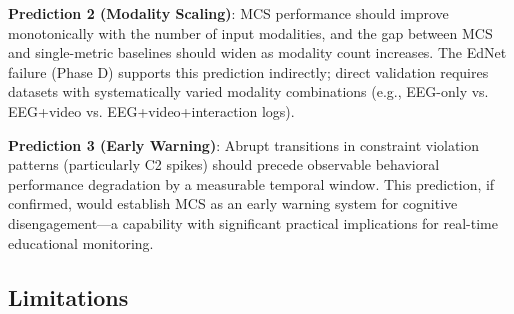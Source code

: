 \documentclass[10pt,journal,compsoc]{IEEEtran}
\begin{document}
\textbf{Prediction 2 (Modality Scaling)}: MCS performance should improve monotonically with the number of input modalities, and the gap between MCS and single-metric baselines should widen as modality count increases. The EdNet failure (Phase D) supports this prediction indirectly; direct validation requires datasets with systematically varied modality combinations (e.g., EEG-only vs. EEG+video vs. EEG+video+interaction logs).

\textbf{Prediction 3 (Early Warning)}: Abrupt transitions in constraint violation patterns (particularly C2 spikes) should precede observable behavioral performance degradation by a measurable temporal window. This prediction, if confirmed, would establish MCS as an early warning system for cognitive disengagement—a capability with significant practical implications for real-time educational monitoring.

\subsection{Limitations}
\end{document}
